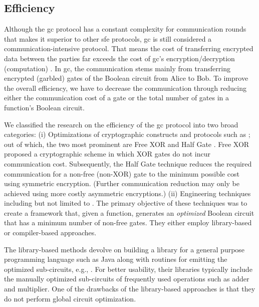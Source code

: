 \subsection{Efficiency}
Although the \acrshort{gc} protocol has a constant complexity for communication rounds that makes it superior to other \acrshort{sfe} protocols, \acrshort{gc} is still considered a communication-intensive protocol.
That means the cost of transferring encrypted data between the parties far exceeds the cost of \acrshort{gc}'s encryption/decryption (computation)  \cite{gueron2015fast}.
In \acrshort{gc}, the communication stems mainly from transferring encrypted (garbled) gates of the Boolean circuit from Alice to Bob.
To improve the overall efficiency, we have to decrease the communication through reducing either the communication cost of a gate or the total number of gates in a function’s Boolean circuit.

We classified the research on the efficiency of the \acrshort{gc} protocol into two broad categories:
(i) Optimizations of cryptographic constructs and protocols such as \cite{kolesnikov2008improved,pinkas2009secure,bellare2012foundations,bellare2013efficient,kolesnikov2014flexor,zahur2015two}; out of which, the two most prominent are Free XOR \cite{kolesnikov2008improved} and Half Gate \cite{zahur2015two}.
Free XOR proposed a cryptographic scheme in which XOR gates do not incur communication cost.
Subsequently, the Half Gate technique reduces the required communication for a non-free (non-XOR) gate to the minimum possible cost using symmetric encryption.
(Further communication reduction may only be achieved using more costly asymmetric encryptions.)
(ii) Engineering techniques including but not limited to \cite{henecka2010tasty,huang2011faster,henecka2013faster,kreuter2013pcf,franz2014cbmc,mood2016frigate}.
The primary objective of these techniques was to create a framework that, given a function, generates an \textit{optimized} Boolean circuit that has a minimum number of non-free gates.
They either employ library-based or compiler-based approaches.

The library-based methods devolve on building a library for a general purpose programming language such as Java along with routines for emitting the optimized sub-circuits, e.g., \cite{huang2011faster,malka2011vmcrypt,henecka2013faster}.
For better usability, their libraries typically include the manually optimized sub-circuits of frequently used operations such as adder and multiplier.
One of the drawbacks of the library-based approaches is that they do not perform global circuit optimization.

